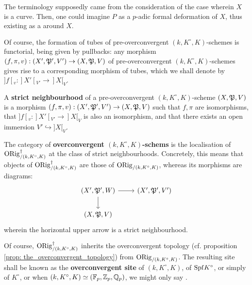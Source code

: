             \begin{remark}
                The terminology supposedly came from the consideration of the case wherein $X$ is a curve. Then, one could imagine $P$ as a $p$-adic formal deformation of $X$, thus existing as a  around $X$. 
            \end{remark}
            \begin{convention}
                Of course, the formation of tubes of pre-overconvergent $(k, K^{\circ}, K)$-schemes is functorial, being given by pullbacks: any morphism $(f, \pi, v): (X', \mathfrak{P}', V') \to (X, \mathfrak{P}, V)$ of pre-overconvergent $(k, K^{\circ}, K)$-schemes gives rise to a corresponding morphism of tubes, which we shall denote by $]f[_v: ]X'[_{V'} \to ]X[_V$.
            \end{convention}
            \begin{definition} \label{def: strict_neighbourhoods_of_pre_overconvergent_schemes}
                A \textbf{strict neighbourhood} of a pre-overconvergent $(k, K^{\circ}, K)$-scheme $(X, \mathfrak{P}, V)$ is a morphism $(f, \pi, v): (X', \mathfrak{P}', V') \to (X, \mathfrak{P}, V)$ such that $f, \pi$ are isomorphisms, that $]f[_v: ]X'[_{V'} \to ]X[_V$ is also an isomorphism, and that there exists an open immersion $V' \hookrightarrow ]X[_V$. 
            \end{definition}
            \begin{definition} \label{def: overconvergent_schemes}
                 The category of \textbf{overconvergent $(k, K^{\circ}, K)$-schems} is the localisation of $\mathrm{ORig}^{\dagger}_{/(k, K^{\circ}, K)}$ at the class of strict neighbourhoods. Concretely, this means that objects of $\mathrm{ORig}^{\dagger}_{/(k, K^{\circ}, K)}$ are those of $\mathrm{ORig}_{/(k, K^{\circ}, K)}$, whereas its morphisms are diagrams:
                    $$
                        \begin{tikzcd}
                        	{(X', \frakP', W)} & {(X', \frakP', V')} \\
                        	{(X, \frakP, V)}
                        	\arrow[from=1-1, to=1-2]
                        	\arrow[from=1-1, to=2-1]
                        \end{tikzcd}
                    $$
                wherein the horizontal upper arrow is a strict neighbourhood. 
            \end{definition}
            \begin{remark}
                Of course, $\mathrm{ORig}^{\dagger}_{/(k, K^{\circ}, K)}$ inherits the overconvergent topology (cf. proposition \ref{prop: the_overconvergent_topology}) from $\mathrm{ORig}_{/(k, K^{\circ}, K)}$. The resulting site shall be known as the \textbf{overconvergent site} of $(k, K^{\circ}, K)$, of $\mathrm{Spf} K^{\circ}$, or simply of $K^{\circ}$, or when $(k, K^{\circ}, K) \simeq (\mathbb{F}_p, \mathbb{Z}_p, \mathbb{Q}_p)$, we might only say .
            \end{remark}
